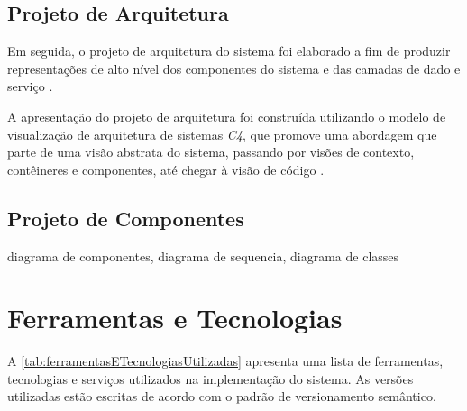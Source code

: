 \subsection{Projeto de Arquitetura}
\label{subsec:projetoDeArquitetura}

Em seguida, o projeto de arquitetura do sistema foi elaborado a fim de produzir representações de alto nível dos componentes do sistema e das camadas de dado e serviço \citep{pressman2016}.

A apresentação do projeto de arquitetura foi construída utilizando o modelo de visualização de arquitetura de sistemas \textit{C4}, que promove uma abordagem que parte de uma visão abstrata do sistema, passando por visões de contexto, contêineres e componentes, até chegar à visão de código \citep{brown2018}.



\subsection{Projeto de Componentes}
\label{subsec:projetoDeComponentes}
% 




diagrama de componentes, diagrama de sequencia, diagrama de classes


\section{Ferramentas e Tecnologias}
\label{sec:ferramentasETecnologias}

A \autoref{tab:ferramentasETecnologiasUtilizadas} apresenta uma lista de ferramentas, tecnologias e serviços utilizados na implementação do sistema. As versões utilizadas estão escritas de acordo com o padrão de versionamento semântico. \citep{semverdocs}

